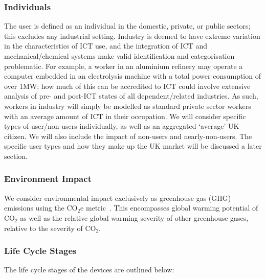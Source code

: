 \documentclass[conference]{IEEEtran}
\begin{document}
\subsubsection{Individuals}

The user is defined as an individual in the domestic, private, or
public sectors; this excludes any industrial setting. Industry is
deemed to have extreme variation in the characteristics of ICT use,
and the integration of ICT and mechanical/chemical systems make valid
identification and categorisation problematic. For example, a worker
in an aluminium refinery may operate a computer embedded in an
electrolysis machine with a total power consumption of over 1MW; how
much of this can be accredited to ICT could involve extensive analysis
of pre- and post-ICT states of all dependent/related industries. As
such, workers in industry will simply be modelled as standard private
sector workers with an average amount of ICT in their occupation.  We
will consider specific types of user/non-users individually, as well
as an aggregated `average' UK citizen. We will also include the impact
of non-users and nearly-non-users. The specific user types and how
they make up the UK market will be discussed a later section.

\subsubsection{Environment Impact}

We consider environmental impact exclusively as greenhouse gas (GHG) emissions using the CO$_2$e metric~\cite{bsi2050:2011,ieaco2em:2014}. This encompasses global warming potential of CO$_2$ as well as the relative global warming
severity of other greenhouse gases, relative to the severity of
CO$_2$. 


\subsubsection{Life Cycle Stages}

The life cycle stages of the devices are outlined below:
\end{document}
